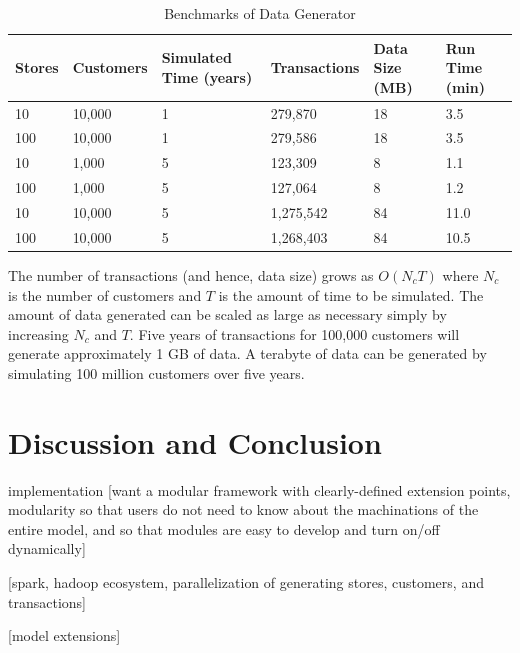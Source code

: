 \documentclass[conference]{IEEEtran}
\begin{document}
\begin{table}[!t]
\renewcommand{\arraystretch}{1.3}
\caption{Benchmarks of Data Generator}
\label{tab:benchmarks}
\centering
\begin{tabular}{|p{0.75cm}||p{1.2cm}||p{1cm}||p{1.25cm}||p{1cm}||p{1cm}|}
\hline
Stores & Customers & Simulated Time (years) & Transactions & Data Size (MB) & Run Time (min)\\ \hline
10 & 10,000 & 1 & 279,870 & 18 & 3.5 \\ \hline
100 & 10,000 & 1 & 279,586 & 18 & 3.5 \\ \hline
10 & 1,000 & 5 & 123,309 & 8 & 1.1 \\ \hline
100 & 1,000 & 5 & 127,064 & 8 & 1.2 \\ \hline
10 & 10,000 & 5 & 1,275,542 & 84 & 11.0 \\ \hline
100 & 10,000 & 5 & 1,268,403 & 84 & 10.5 \\ \hline
\end{tabular}
\end{table}

The number of transactions (and hence, data size) grows as $O(N_c T)$ where $N_c$ is the number of customers and $T$ is the amount of time to be simulated. The amount of data generated can be scaled as large as necessary simply by increasing $N_c$ and $T$. Five years of transactions for 100,000 customers will generate approximately 1 GB of data. A terabyte of data can be generated by simulating 100 million customers over five years. 

\section{Discussion and Conclusion}
implementation
[want a modular framework with clearly-defined extension points, modularity so that users do not need to know about the machinations of the entire model, and so that modules are easy to develop and turn on/off dynamically]

[spark, hadoop ecosystem, parallelization of generating stores, customers, and transactions]

[model extensions]
\end{document}
